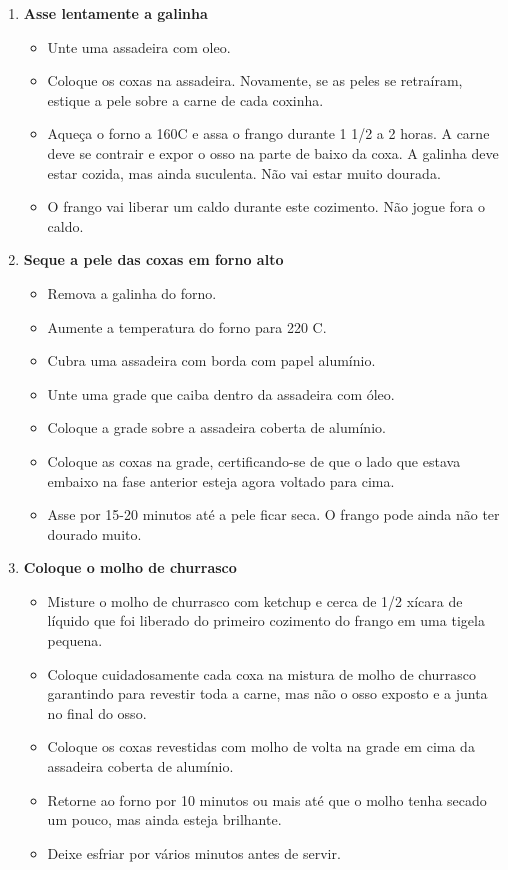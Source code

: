 \documentclass [11pt, letterpaper] {article}
\begin{document}
\begin {description}
\begin {enumerate}
\begin {itemize}
\item Polvilhe a mistura de especiarias sobre as coxas e mexa de modo a que todos estejam bem revestidos.
\item Cubra e refrigere por pelo menos uma hora, mas você pode refrigerar durante a noite.
\end {itemize}
\item {\bf Asse lentamente a galinha}
\begin {itemize}
\item Unte uma assadeira com oleo.
\item Coloque os coxas na assadeira. Novamente, se as peles se retraíram, estique a pele sobre a carne de cada coxinha.
\item Aqueça o forno a 160C e assa o frango durante 1 1/2 a 2 horas. A carne deve se contrair e expor o osso na parte de baixo da coxa. A galinha deve estar cozida, mas ainda suculenta. Não vai estar muito dourada.
\item O frango vai liberar um caldo durante este cozimento. Não jogue fora o caldo.
\end {itemize}
\item {\bf Seque a pele das coxas em forno alto}
\begin {itemize}
\item Remova a galinha do forno.
\item Aumente a temperatura do forno para 220 C.
\item Cubra uma assadeira com borda com papel alumínio.
\item Unte uma grade que caiba dentro da assadeira com \'oleo.
\item Coloque a grade sobre a assadeira coberta de alumínio.
\item Coloque as coxas na grade, certificando-se de que o lado que estava embaixo na fase anterior esteja agora voltado para cima.
\item Asse por 15-20 minutos até a pele ficar seca. O frango pode ainda não ter dourado muito.
\end {itemize}
\item {\bf Coloque o molho de churrasco}
\begin {itemize}
\item Misture o molho de churrasco com ketchup e cerca de 1/2 xícara de líquido que foi liberado do primeiro cozimento do frango em uma tigela pequena.
\item Coloque cuidadosamente cada coxa na mistura de molho de churrasco garantindo para revestir toda a carne, mas não o osso exposto e a junta no final do osso.
\item Coloque os coxas revestidas com molho de volta na grade em cima da assadeira coberta de alumínio.
\item Retorne ao forno por 10 minutos ou mais até que o molho tenha secado um pouco, mas ainda esteja brilhante.
\item Deixe esfriar por vários minutos antes de servir.
\end {itemize}
\end {enumerate}
\end {description}
\end{document}
